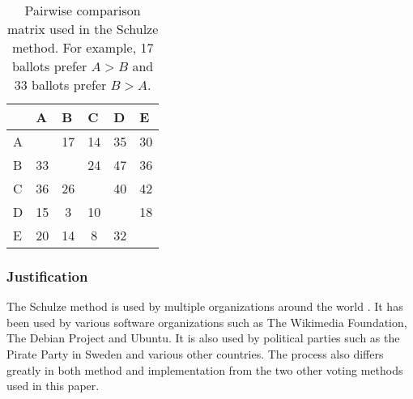 \documentclass[12pt]{article}
\begin{document}
\begin{table}
\centering
\caption{Pairwise comparison matrix used in the Schulze method. For example, 17 ballots prefer $A>B$ and 33 ballots prefer $B>A$.}
\begin{tabular}{l|c|c|c|c|c|}
\cline{2-6}
 & \multicolumn{1}{l|}{A} & \multicolumn{1}{l|}{B} & \multicolumn{1}{l|}{C} & \multicolumn{1}{l|}{D} & \multicolumn{1}{l|}{E} \\ \hline
\multicolumn{1}{|l|}{A} & \cellcolor[HTML]{9B9B9B} & \cellcolor[HTML]{FFDDDD}17 & \cellcolor[HTML]{FFDDDD}14 & \cellcolor[HTML]{DDFFDD}35 & \cellcolor[HTML]{DDFFDD}30 \\ \hline
\multicolumn{1}{|l|}{B} & \cellcolor[HTML]{DDFFDD}33 & \cellcolor[HTML]{9B9B9B} & \cellcolor[HTML]{FFDDDD}24 & \cellcolor[HTML]{DDFFDD}47 & \cellcolor[HTML]{DDFFDD}36 \\ \hline
\multicolumn{1}{|l|}{C} & \cellcolor[HTML]{DDFFDD}36 & \cellcolor[HTML]{DDFFDD}26 & \cellcolor[HTML]{9B9B9B} & \cellcolor[HTML]{DDFFDD}40 & \cellcolor[HTML]{DDFFDD}42 \\ \hline
\multicolumn{1}{|l|}{D} & \cellcolor[HTML]{FFDDDD}15 & \cellcolor[HTML]{FFDDDD}3 & \cellcolor[HTML]{FFDDDD}10 & \cellcolor[HTML]{9B9B9B} & \cellcolor[HTML]{FFDDDD}18 \\ \hline
\multicolumn{1}{|l|}{E} & \cellcolor[HTML]{FFDDDD}20 & \cellcolor[HTML]{FFDDDD}14 & \cellcolor[HTML]{FFDDDD}8 & \cellcolor[HTML]{DDFFDD}32 & \cellcolor[HTML]{9B9B9B} \\ \hline
\end{tabular}
\label{tab:pairwise comparison matrix}
\end{table}
\subsubsection{Justification}
The Schulze method is used by multiple organizations around the world \autocite{wikipedia2017schulze}. It has been used by various software organizations such as The Wikimedia Foundation, The Debian Project and Ubuntu. It is also used by political parties such as the Pirate Party in Sweden and various other countries. The process also differs greatly in both method and implementation from the two other voting methods used in this paper.
\end{document}

